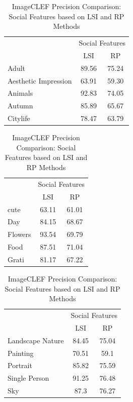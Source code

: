 \begin{table}[!ht]
\caption{ ImageCLEF Precision Comparison: Social Features based on LSI and RP Methods} %
\centering
\begin{tabular}{|p{1.7cm}|c|c|}
 \hline
{\multirow{2}{*}{Labels}} & \multicolumn{2}{|c|}{Social Features} \\
\cline{2-3}
  & LSI & RP \\  [1ex] \hline
Adult & 89.56 & 75.24 \\  [1ex] \hline
Aesthetic Impression & 63.91 & 59.30 \\  [1ex] \hline
Animals & 92.83 & 74.05 \\  [1ex] \hline
Autumn & 85.89 & 65.67 \\  [1ex] \hline
Citylife & 78.47 & 63.79 \\  [1ex] \hline
\end{tabular}
 \hspace{1em}\vspace*{0.5cm}
 \begin{tabular}{|p{1.7cm}|c|c|}
  \hline
{\multirow{2}{*}{Labels}} & \multicolumn{2}{|c|}{Social Features} \\ \cline{2-3}
 & LSI & RP \\ \hline
cute & 63.11 & 61.01 \\  [1ex] \hline
Day & 84.15 & 68.67 \\  [1ex] \hline
Flowers & 93.54 & 69.79 \\  [1ex] \hline
Food & 87.51 & 71.04 \\  [1ex] \hline
Grati & 81.17 & 67.22 \\  [1ex] \hline
\end{tabular}
 \hspace{1em}\vspace*{0.5cm}
 \begin{tabular}{|p{1.7cm}|c|c|}
  \hline
{\multirow{2}{*}{Labels}} & \multicolumn{2}{|c|}{Social Features} \\ \cline{2-3}
 & LSI & RP \\ \hline
Landscape Nature & 84.45 & 75.04 \\  [1ex] \hline
Painting & 70.51 & 59.1 \\  [1ex] \hline
Portrait & 85.82 & 75.59 \\  [1ex] \hline
Single Person & 91.25 & 76.48 \\  [1ex] \hline
Sky & 87.3 & 76.27 \\  [1ex] \hline
\end{tabular}

\end{table}
